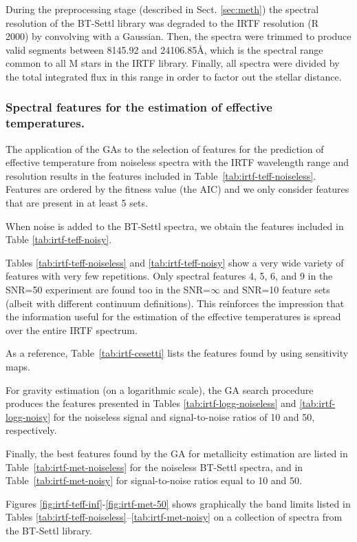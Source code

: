 
During the preprocessing stage (described in Sect. \ref{sec:meth}) the
spectral resolution of the BT-Settl library was degraded to the IRTF
resolution (R ~ 2000) by convolving with a Gaussian. Then, the spectra
were trimmed to produce valid segments between 8145.92 and
24106.85{\AA}, which is the spectral range common to all M stars in
the IRTF library. Finally, all spectra were divided by the total
integrated flux in this range in order to factor out the stellar
distance.

\subsubsection{Spectral features for the estimation of effective temperatures.}

The application of the GAs to the selection of features for the
prediction of effective temperature from noiseless spectra with the
IRTF wavelength range and resolution results in the features included
in Table~\ref{tab:irtf-teff-noiseless}. Features are ordered by the
fitness value (the AIC) and we only consider features that are present
in at least 5 sets.

When noise is added to the BT-Settl spectra, we obtain the features
included in Table \ref{tab:irtf-teff-noisy}.


Tables \ref{tab:irtf-teff-noiseless} and \ref{tab:irtf-teff-noisy}
show a very wide variety of features with very few repetitions. Only
spectral features 4, 5, 6, and 9 in the SNR=50 experiment are found
too in the SNR=$\infty$ and SNR=10 feature sets (albeit with different
continuum definitions). This reinforces the impression that the
information useful for the estimation of the effective temperatures is
spread over the entire IRTF spectrum.

As a reference, Table~\ref{tab:irtf-cesetti} lists the features found
by \cite{cesetti} using sensitivity maps.

For gravity estimation (on a logarithmic scale), the GA search
procedure produces the features presented in
Tables \ref{tab:irtf-logg-noiseless} and \ref{tab:irtf-logg-noisy} for
the noiseless signal and signal-to-noise ratios of 10 and 50,
respectively.

Finally, the best features found by the GA for metallicity estimation
are listed in Table~\ref{tab:irtf-met-noiseless} for the noiseless BT-Settl
spectra, and in Table~\ref{tab:irtf-met-noisy} for signal-to-noise
ratios equal to 10 and 50.

Figures \ref{fig:irtf-teff-inf}-\ref{fig:irtf-met-50} shows
graphically the band limits listed in
Tables \ref{tab:irtf-teff-noiseless}--\ref{tab:irtf-met-noisy} on a
collection of spectra from the BT-Settl library.


